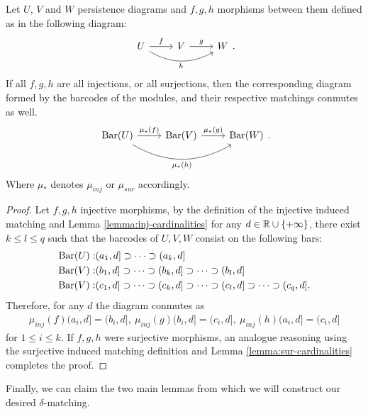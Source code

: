 \begin{lemma} \cite[Claim 3.1.13]{polterovich} \label{lemma:functoriality}
    Let $ U$, $V$ and $W$ persistence diagrams and $f, g, h$ morphisms between them defined as in the following diagram:
    $$
        \begin{tikzcd}
            U \arrow[r, "f"] \arrow[rr, "h"', bend right] & V \arrow[r, "g"] & W
        \end{tikzcd}.
    $$
    If all $ f, g, h$ are all injections, or all surjections, then the corresponding diagram formed by the barcodes of the modules, and their respective matchings conmutes as well.
    $$
        \begin{tikzcd}
            \barc(U) \arrow[r, "\mu_*(f)"] \arrow[rr, "\mu_*(h)"', bend right] & \barc(V) \arrow[r, "\mu_*(g)"] & \barc(W)
        \end{tikzcd}.
    $$
    Where $ \mu_* $ denotes $ \mu_{inj} $ or $ \mu_{sur} $ accordingly.
\end{lemma}
\begin{proof}
    Let $f, g, h$ injective morphisms, by the definition of the injective induced matching and Lemma \ref{lemma:inj-cardinalities} for any $ d \in \mathbb R \cup \{+ \infty\}$, there exist $ k \leq l \leq q $ such that the barcodes of $ U, V, W$ consist on the following bars:
    \begin{align*}
        \operatorname{Bar}(U):& (a_1, d] \supset \cdots \supset (a_k, d] \\
        \operatorname{Bar}(V):& (b_1, d] \supset \cdots \supset (b_k, d] \supset \cdots \supset (b_l, d] \\
        \operatorname{Bar}(V):& (c_1, d] \supset \cdots \supset (c_k, d] \supset \cdots \supset (c_l, d] \supset \cdots \supset (c_q, d]. \\
    \end{align*}
    Therefore, for any $ d $ the diagram conmutes as
    \begin{align*}
        \mu_{inj}(f)(a_i, d] = (b_i, d], \ \mu_{inj}(g)(b_i, d] = (c_i, d], \ \mu_{inj}(h)(a_i, d] = (c_i, d]
    \end{align*}
    for $ 1 \leq i \leq k$. If $f, g, h$ were surjective morphisms, an analogue reasoning using the surjective induced matching definition and Lemma \ref{lemma:sur-cardinalities} completes the proof.
\end{proof}

Finally, we can claim the two main lemmas from which we will construct our desired $\delta$-matching.

